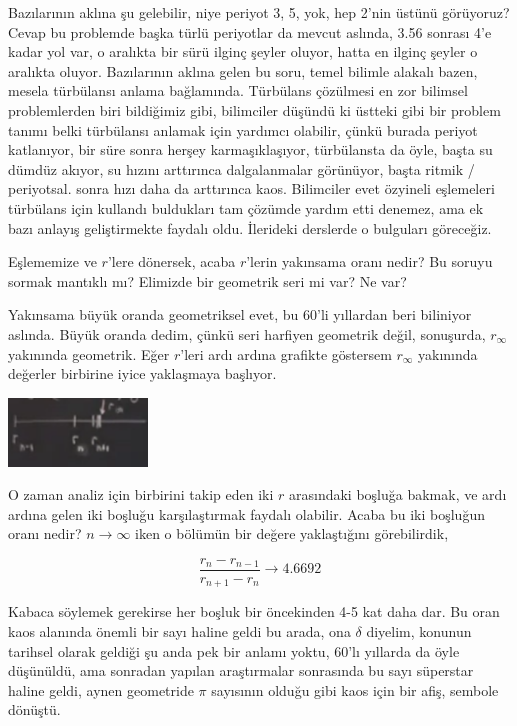 \documentclass[12pt,fleqn]{article}\usepackage{../../common}
\begin{document}
Bazılarının aklına şu gelebilir, niye periyot 3, 5, yok, hep 2'nin üstünü
görüyoruz? Cevap bu problemde başka türlü periyotlar da mevcut aslında,
3.56 sonrası 4'e kadar yol var, o aralıkta bir sürü ilginç şeyler oluyor,
hatta en ilginç şeyler o aralıkta oluyor. Bazılarının aklına gelen bu soru,
temel bilimle alakalı bazen, mesela türbülansı anlama bağlamında. Türbülans
çözülmesi en zor bilimsel problemlerden biri bildiğimiz gibi, bilimciler
düşündü ki üstteki gibi bir problem tanımı belki türbülansı anlamak için
yardımcı olabilir, çünkü burada periyot katlanıyor, bir süre sonra herşey
karmaşıklaşıyor, türbülansta da öyle, başta su dümdüz akıyor, su hızını
arttırınca dalgalanmalar görünüyor, başta ritmik / periyotsal. sonra hızı
daha da arttırınca kaos. Bilimciler evet özyineli eşlemeleri türbülans için
kullandı buldukları tam çözümde yardım etti denemez, ama ek bazı anlayış
geliştirmekte faydalı oldu. İlerideki derslerde o bulguları göreceğiz.

Eşlememize ve $r$'lere dönersek, acaba $r$'lerin yakınsama oranı nedir? Bu
soruyu sormak mantıklı mı? Elimizde bir geometrik seri mi var? Ne var?

Yakınsama büyük oranda geometriksel evet, bu 60'li yıllardan beri biliniyor
aslında. Büyük oranda dedim, çünkü seri harfiyen geometrik değil,
sonuşurda, $r_\infty$ yakınında geometrik. Eğer $r$'leri ardı ardına
grafikte göstersem $r_\infty$ yakınında değerler birbirine iyice yaklaşmaya
başlıyor. 

\includegraphics[width=10em]{19_06.png}

O zaman analiz için birbirini takip eden iki $r$ arasındaki boşluğa bakmak,
ve ardı ardına gelen iki boşluğu karşılaştırmak faydalı olabilir. Acaba bu
iki boşluğun oranı nedir? $n\to\infty$ iken o bölümün bir değere
yaklaştığını görebilirdik,

$$ 
\frac{r_n-r_{n-1}}{r_{n+1}-r_n} \to 4.6692
$$

Kabaca söylemek gerekirse her boşluk bir öncekinden 4-5 kat daha dar. Bu
oran kaos alanında önemli bir sayı haline geldi bu arada, ona $\delta$
diyelim, konunun tarihsel olarak geldiği şu anda pek bir anlamı yoktu,
60'lı yıllarda da öyle düşünüldü, ama sonradan yapılan araştırmalar
sonrasında bu sayı süperstar haline geldi, aynen geometride $\pi$ sayısının
olduğu gibi kaos için bir afiş, sembole dönüştü.
\end{document}
